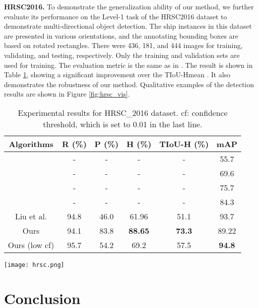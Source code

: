     
  {\bf HRSC2016.} To demonstrate the generalization ability of our method, we further evaluate its performance on the Level-1 task of the HRSC2016 dataset \cite{liu2017rotated} to demonstrate multi-directional object detection. The ship instances in this dataset are presented in various orientations, and the annotating bounding boxes are based on rotated rectangles. There were 436, 181, and 444 images for training, validating, and testing, respectively. Only the training and validation sets are used for training. The evaluation metric is the same as in \cite{liu2019omnidirectional,karatzas2015icdar}. The result is shown in Table \ref{tab:hrsc}, showing a significant improvement over the TIoU-Hmean \cite{liu2019tightness}. It also demonstrates the robustness of our method. Qualitative examples of the detection results are shown in Figure \ref{fig:hrsc_vis}.

\begin{table}[!t]
\centering
\small
\begin{tabular}{c|ccccc}
  \hline
  Algorithms & R (\%) & P (\%) & H (\%) & TIoU-H (\%) & mAP \\
  \hline
  \cite{girshick2015fast,liao2018rotation}&-&-&-&- & 55.7\\
  \cite{girshick2015fast,liao2018rotation}&-&-&-&- & 69.6\\
  \cite{girshick2015fast,liao2018rotation}&-&-&-&- & 75.7\\
  \cite{liao2018rotation}&-&-&-&- & 84.3 \\
  \hline
  \hline
 Liu et al. \cite{liu2019omnidirectional}& 94.8 & 46.0 & 61.96 & 51.1 & 93.7 \\
  \hline
  Ours & 94.1 & 83.8 & \bf 88.65 & \bf 73.3 & 89.22 \\
  \hline
  Ours (low cf) & 95.7 & 54.2 & 69.2 & 57.5 & \bf94.8 \\
  \hline
\end{tabular}
\caption{Experimental results for HRSC\_2016 dataset. cf: confidence threshold, which is set to 0.01 in the last line.}
\label{tab:hrsc}
\end{table}

\begin{figure*}
    \centering
    \texttt{[image: hrsc.png]}
    \caption{Qualitative detection results on the HRSC2016 dataset.}
    \label{fig:hrsc_vis}
\end{figure*}


\section{Conclusion}

